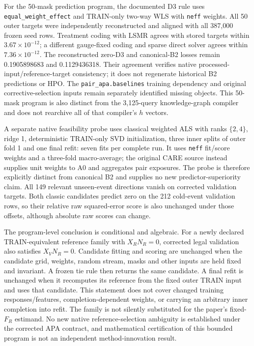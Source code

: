 \documentclass[11pt]{article}
\begin{document}
For the 50-mask prediction program, the documented D3 rule uses \texttt{equal\_weight\_effect} and TRAIN-only two-way WLS with \texttt{neff} weights. All 50 outer targets were independently reconstructed and aligned with all 387,000 frozen seed rows. Treatment coding with LSMR agrees with stored targets within $3.67\times10^{-12}$; a different gauge-fixed coding and sparse direct solver agrees within $7.36\times10^{-12}$. The reconstructed zero-D3 and canonical-B2 losses remain 0.1905898683 and 0.1129436318. Their agreement verifies native processed-input/reference-target consistency; it does not regenerate historical B2 predictions or HPO. The \texttt{pair\_apa.baselines} training dependency and original corrective-selection inputs remain separately identified missing objects. This 50-mask program is also distinct from the 3,125-query knowledge-graph compiler and does not rearchive all of that compiler's $h$ vectors.

A separate native feasibility probe uses classical weighted ALS with ranks $\{2,4\}$, ridge 1, deterministic TRAIN-only SVD initialization, three inner splits of outer fold 1 and one final refit: seven fits per complete run. It uses \texttt{neff} fit/score weights and a three-fold macro-average; the original CARE source instead supplies unit weights to A0 and aggregates pair exposures. The probe is therefore explicitly distinct from canonical B2 and supplies no new predictor-superiority claim. All 149 relevant unseen-event directions vanish on corrected validation targets. Both classic candidates predict zero on the 212 cold-event validation rows, so their relative raw squared-error score is also unchanged under those offsets, although absolute raw scores can change.

The program-level conclusion is conditional and algebraic. For a newly declared TRAIN-equivalent reference family with $X_RN_R=0$, corrected legal validation also satisfies $X_VN_R=0$. Candidate fitting and scoring are unchanged when the candidate grid, weights, random stream, masks and other inputs are held fixed and invariant. A frozen tie rule then returns the same candidate. A final refit is unchanged when it recomputes its reference from the fixed outer TRAIN input and uses that candidate. This statement does not cover changed training responses/features, completion-dependent weights, or carrying an arbitrary inner completion into refit. The family is not silently substituted for the paper's fixed-$F_R$ estimand. No new native reference-selection ambiguity is established under the corrected APA contract, and mathematical certification of this bounded program is not an independent method-innovation result.
\end{document}

